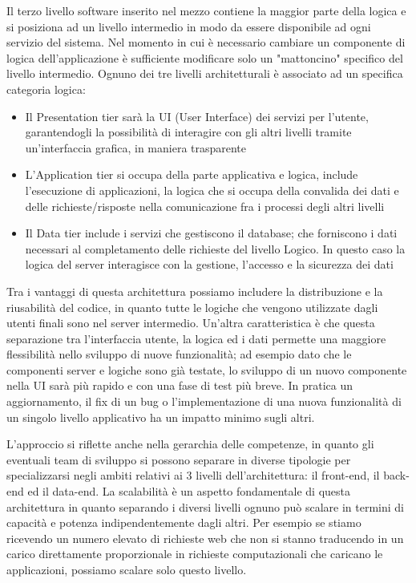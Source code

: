 Il terzo livello software inserito nel mezzo contiene la maggior parte della logica
e si posiziona ad un livello intermedio in modo da essere disponibile ad ogni
servizio del sistema. Nel momento in cui è necessario cambiare un componente di
logica dell’applicazione è sufficiente modificare solo un "mattoncino" specifico del
livello intermedio.
Ognuno dei tre livelli architetturali è associato ad un specifica categoria logica:
\begin{itemize}
	\item Il Presentation tier sarà la UI (User Interface) dei servizi per l’utente,
	garantendogli la possibilità di interagire con gli altri livelli tramite
	un'interfaccia grafica, in maniera trasparente
	\item L'Application tier si occupa della parte applicativa e logica,
	include l’esecuzione di applicazioni, la logica che si occupa della convalida
	dei dati e delle richieste/risposte nella comunicazione fra i processi degli
	altri livelli
	\item Il Data tier include i servizi che gestiscono il database; che forniscono
	i dati necessari al completamento delle richieste del livello Logico. In questo
	caso la logica del server interagisce con la gestione, l’accesso e la sicurezza
	dei dati
\end{itemize}
Tra i vantaggi di questa architettura possiamo includere la distribuzione e la
riusabilità del codice, in quanto tutte le logiche che vengono utilizzate dagli
utenti finali sono nel server intermedio. Un'altra caratteristica è che questa
separazione tra l'interfaccia utente, la logica ed i dati permette una maggiore
flessibilità nello sviluppo di nuove funzionalità; ad esempio dato che le
componenti server e logiche sono già testate, lo sviluppo di un nuovo componente
nella UI sarà più rapido e con una fase di test più breve. In pratica un
aggiornamento, il fix di un bug o l'implementazione di una nuova funzionalità di
un singolo livello applicativo ha un impatto minimo sugli altri.

L'approccio si riflette anche nella gerarchia delle competenze, in quanto gli
eventuali team di sviluppo si possono separare in diverse tipologie per
specializzarsi negli ambiti relativi ai 3 livelli dell'architettura: il front-end,
il back-end ed il data-end. La scalabilità è un aspetto fondamentale di questa
architettura in quanto separando i diversi livelli ognuno può scalare in termini
di capacità e potenza indipendentemente dagli altri. Per esempio se stiamo ricevendo
un numero elevato di richieste web che non si stanno traducendo in un carico
direttamente proporzionale in richieste computazionali che caricano le applicazioni,
possiamo scalare solo questo livello.

